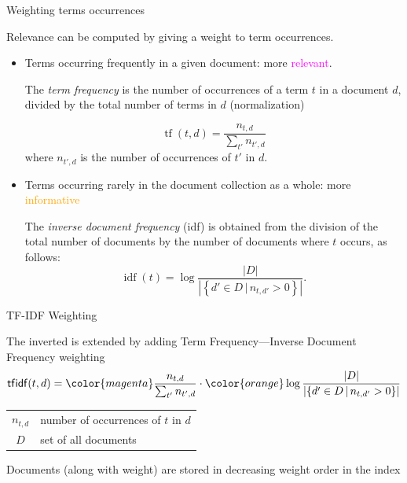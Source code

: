 \begin{frame}{Weighting terms occurrences}

Relevance can be computed by giving a \alert{weight}
to term occurrences.
\begin{itemize}

\item Terms occurring \alert{frequently} in a \alert{given document}:
more \textcolor{magenta}{relevant}.


The \emph{term frequency} is the number of occurrences of a term $t$ in a
document $d$, divided by the total number of terms in $d$ (normalization)

\[\mathop{\mathrm{tf}}(t,d)=\frac{n_{t,d}}{\sum_{t'} n_{t',d}}\]
\noindent
where $n_{t',d}$ is the number of occurrences of $t'$ in $d$.  

\item Terms occurring \alert{rarely} in the \alert{document collection}
as a whole: more \textcolor{orange}{informative}

The \emph{inverse document frequency}  (idf) is obtained from the division of 
the total number of documents by the number of documents where $t$ occurs, as follows:
\[\mathop{\mathrm{idf}}(t)=\log\frac{|D|}{\left|\left\{d'\in
D\,|\,n_{t,d'}>0\right\}\right|}.\]

\end{itemize}

\end{frame}

\begin{frame}{TF-IDF Weighting}

The inverted is extended by adding 
\alert{Term Frequency---Inverse Document Frequency} weighting
 \[
\mathop{\mathsf{tf{}idf}}(t,d)={\color{magenta}\frac{n_{t,d}}{\sum_{t'}
n_{t',d}}}\cdot
\color{orange}\log\frac{|D|}{\left|\left\{d'\in D\,|\,n_{t,d'}>0\right\}\right|}\]
\begin{center}\begin{tabular}{cl}
$n_{t,d}$&number of occurrences of $t$ in $d$\\
$D$&set of all documents
\end{tabular}
\end{center}

Documents (along with weight) are stored in \alert{decreasing weight
order} in
the index

\end{frame}


